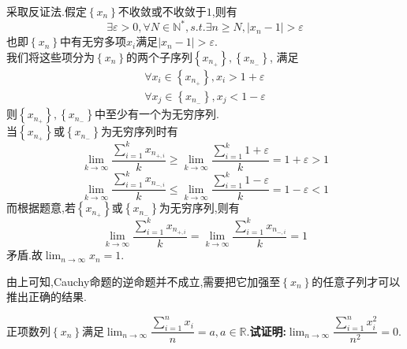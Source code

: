 \documentclass[a4paper]{ctexart}
\begin{document}
\begin{solution}[Proof.]
    采取反证法.假定$\left\{ x_n\right\}$不收敛或不收敛于$1$,则有
    $$\exists\varepsilon>0,\forall N\in\mathbb{N}^*,s.t.\exists n\geqslant N,\left\lvert x_n-1\right\rvert>\varepsilon$$
    也即$\left\{ x_n\right\}$中有无穷多项$x_i$满足$\left\lvert x_n-1\right\rvert>\varepsilon$.\\
    我们将这些项分为$\left\{ x_n\right\}$的两个子序列$\left\{ x_{n_+}\right\},\left\{ x_{n_-}\right\}$,
    满足$$\begin{aligned}
    \forall x_i\in\left\{ x_{n_+}\right\},x_i>1+\varepsilon \\
    \forall x_j\in\left\{ x_{n_-}\right\},x_j<1-\varepsilon
    \end{aligned}$$
    则$\left\{ x_{n_+}\right\},\left\{ x_{n_-}\right\}$中至少有一个为无穷序列.\\
    当$\left\{ x_{n_+}\right\}$或$\left\{ x_{n_-}\right\}$为无穷序列时有
    $$\lim_{k\to\infty}{\dfrac{\sum_{i=1}^{k}{x_{n_{+,i}}}}{k}}\geqslant \lim_{k\to\infty}{\dfrac{\sum_{i=1}^{k}{1+\varepsilon}}{k}}=1+\varepsilon>1$$
    $$\lim_{k\to\infty}{\dfrac{\sum_{i=1}^{k}{x_{n_{-,i}}}}{k}}\leqslant \lim_{k\to\infty}{\dfrac{\sum_{i=1}^{k}{1-\varepsilon}}{k}}=1-\varepsilon<1$$
    而根据题意,若$\left\{ x_{n_+}\right\}$或$\left\{ x_{n_-}\right\}$为无穷序列,则有
    $$\lim_{k\to\infty}{\dfrac{\sum_{i=1}^{k}{x_{n_{+,i}}}}{k}}=\lim_{k\to\infty}{\dfrac{\sum_{i=1}^{k}{x_{n_{-,i}}}}{k}=1}$$
    矛盾.故$\displaystyle\lim_{n\to\infty}{x_n}=1$.
\end{solution}
\begin{theorem}
    由上可知,Cauchy命题的逆命题并不成立,需要把它加强至$\left\{x_n\right\}$的任意子列才可以推出正确的结果.
\end{theorem}
\begin{problem}[例2(24.10.09 SJTU数分小测):]
    正项数列$\left\{ x_n\right\}$满足$\displaystyle\lim_{n\to\infty}{\dfrac{\sum_{i=1}^{n}{x_i}}{n}}=a,a\in\mathbb{R}$.\textbf{试证明:}$\displaystyle\lim_{n\to\infty}{\dfrac{\sum_{i=1}^{n}{x_i^2}}{n^2}}=0$.
\end{problem}
\end{document}
